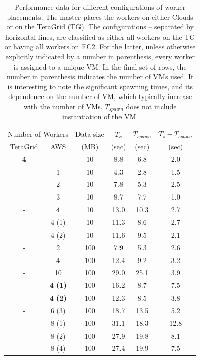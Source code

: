 \documentclass[3p,twocolumn]{elsarticle}
\newcommand{\upp}{\vspace*{-0.6em}}
\begin{document}
\begin{table}
\upp
\begin{tabular}{cccccc}
  \hline
  \multicolumn{2}{c}{Number-of-Workers}  &  Data size   &  $T_s$  & $T_{spawn}$ & $T_s - T_{spawn}$\\   
  TeraGrid &  AWS &   (MB)  & (sec) & (sec)  & (sec) \\
  \hline
  { {\bf 4}} & - & 10  &  8.8 &  6.8 & 2.0 \\
  \hline 
  - & 1 & 10 & 4.3 & 2.8 & 1.5 \\
  - & 2 & 10 & 7.8 & 5.3 & 2.5 \\ 
  - & 3 & 10 & 8.7 & 7.7 & 1.0 \\
  - & {\bf 4} & 10 & 13.0 & 10.3 & 2.7 \\
  - & 4 (1) & 10 & 11.3 & 8.6 & 2.7 \\
  - & 4 (2) & 10 & 11.6 & 9.5 & 2.1 \\
  \hline 
  -  & 2  & 100 & 7.9  & 5.3 & 2.6 \\
  -  & {\bf 4}  & 100 & 12.4 & 9.2 & 3.2\\
  -  & 10 & 100 & 29.0 & 25.1 & 3.9 \\
  \hline
  - & {\bf 4 (1)} & 100 & 16.2 & 8.7 & 7.5 \\ 
  - & {\bf 4 (2)} & 100 & 12.3 & 8.5 & 3.8 \\
  - & 6 (3) & 100 & 18.7 & 13.5 & 5.2\\
  - & 8 (1) & 100 & 31.1 & 18.3 & 12.8 \\
  - & 8 (2) & 100 & 27.9 & 19.8 & 8.1\\
  - & 8 (4) & 100 & 27.4 & 19.9 & 7.5\\
  \hline \hline
\end{tabular}
\upp
\caption{Performance data for different configurations of worker placements. The master places the workers on either Clouds or on the TeraGrid (TG). The configurations -- separated by horizontal lines, are classified as either all workers on the TG or having all workers on EC2. For the latter, unless otherwise explicitly indicated
  by a number in parenthesis, every worker is assigned to a unique VM. In the
  final set of rows, the number  in parenthesis indicates the number of VMs used. It is interesting to note the significant spawning times, and its dependence on the number of VM, which typically increase with the number of VMs. $T_{spawn}$ does not include instantiation of the VM.}
\label{stuff-1}
\upp
\upp
\end{table}
\end{document}
